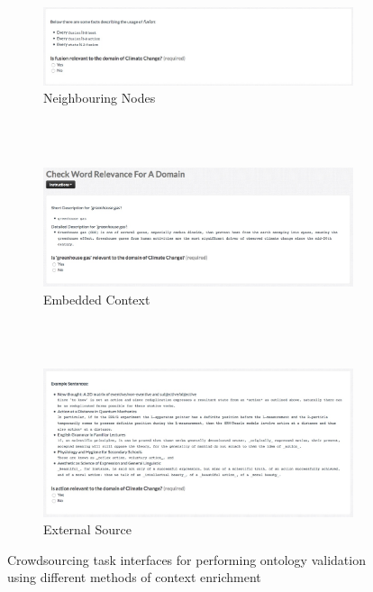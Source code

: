 \begin{figure}
    \centering
    \begin{subfigure}[b]{\textwidth}
        \includegraphics[width=\textwidth]{screenshots/questionaire_subclass_relation_context_enrichment}
        \caption{Neighbouring Nodes}
        \label{fig:crowdsourcing_interface_nn}
    \end{subfigure}
	~\\~\\
    \begin{subfigure}[b]{\textwidth}
        \includegraphics[width=\textwidth]{screenshots/questionaire_embedded_context_enrichment}
        \caption{Embedded Context}
        \label{fig:crowdsourcing_interface_ec}
    \end{subfigure}
	~\\~\\
    \begin{subfigure}[b]{\textwidth}
        \includegraphics[width=\textwidth]{screenshots/questionaire_wordnik_context_enrichment}
        \caption{External Source}
        \label{fig:crowdsourcing_interface_es}
    \end{subfigure}
    \caption{Crowdsourcing task interfaces for performing ontology validation using different methods of context enrichment}\label{fig:all_crowdsourcing_interfaces}
\end{figure}


